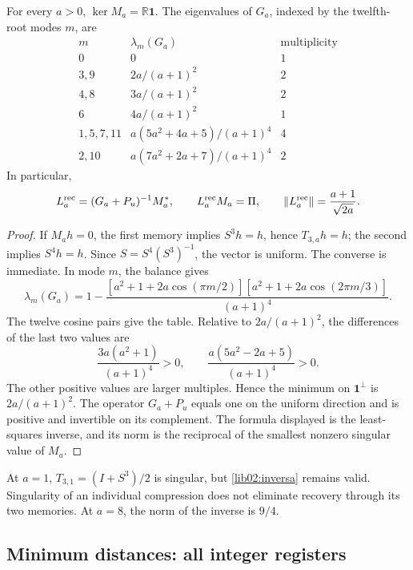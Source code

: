 \begin{theorem}
\label{lib02:inversa-memorias}
For every \(a>0\), \(\ker M_a=\mathbb R\mathbf1\). The eigenvalues of \(G_a\), indexed by the twelfth-root modes \(m\), are
\[
\begin{array}{c|c|c}
 m&\lambda_m(G_a)&\text{multiplicity}\\\hline
 0&0&1\\
 3,9&2a/(a+1)^2&2\\
 4,8&3a/(a+1)^2&2\\
 6&4a/(a+1)^2&1\\
 1,5,7,11&a(5a^2+4a+5)/(a+1)^4&4\\
 2,10&a(7a^2+2a+7)/(a+1)^4&2
\end{array}
\]
In particular,
\begin{equation}
 L_a^{\rm rec}=(G_a+P_u)^{-1}M_a^*,\qquad
 L_a^{\rm rec}M_a=\Pi,\qquad
 \|L_a^{\rm rec}\|=\frac{a+1}{\sqrt{2a}}.
 \label{lib02:inversa}
\end{equation}
\end{theorem}
\begin{proof}
If \(M_ah=0\), the first memory implies \(S^3h=h\), hence \(T_{3,a}h=h\); the second implies \(S^4h=h\). Since \(S=S^4(S^3)^{-1}\), the vector is uniform. The converse is immediate. In mode \(m\), the balance gives
\[
 \lambda_m(G_a)=1-
 \frac{[a^2+1+2a\cos(\pi m/2)]
 [a^2+1+2a\cos(2\pi m/3)]}{(a+1)^4}.
\]
The twelve cosine pairs give the table. Relative to \(2a/(a+1)^2\), the differences of the last two values are
\[
 \frac{3a(a^2+1)}{(a+1)^4}>0,\qquad
 \frac{a(5a^2-2a+5)}{(a+1)^4}>0.
\]
The other positive values are larger multiples. Hence the minimum on \(\mathbf1^\perp\) is \(2a/(a+1)^2\). The operator \(G_a+P_u\) equals one on the uniform direction and is positive and invertible on its complement. The formula displayed is the least-squares inverse, and its norm is the reciprocal of the smallest nonzero singular value of \(M_a\).
\end{proof}

At \(a=1\), \(T_{3,1}=(I+S^3)/2\) is singular, but \eqref{lib02:inversa} remains valid. Singularity of an individual compression does not eliminate recovery through its two memories. At \(a=8\), the norm of the inverse is \(9/4\).

\subsection{Minimum distances: all integer registers}
\label{lib02:redes}

